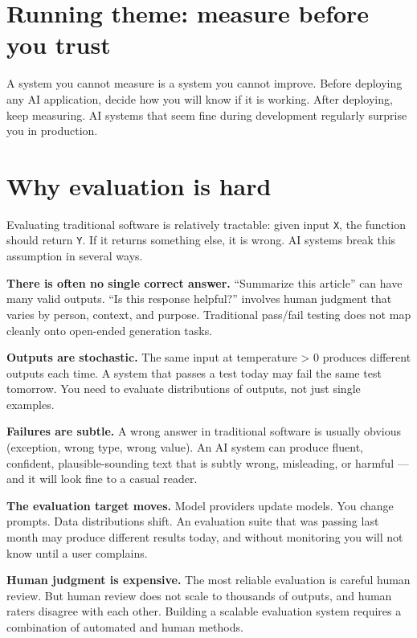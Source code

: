 \section*{Running theme: measure before you trust}

A system you cannot measure is a system you cannot improve. Before deploying any AI application, decide how you will know if it is working. After deploying, keep measuring. AI systems that seem fine during development regularly surprise you in production.

\section{Why evaluation is hard}

Evaluating traditional software is relatively tractable: given input \texttt{X}, the function should return \texttt{Y}. If it returns something else, it is wrong. AI systems break this assumption in several ways.

\textbf{There is often no single correct answer.} ``Summarize this article'' can have many valid outputs. ``Is this response helpful?'' involves human judgment that varies by person, context, and purpose. Traditional pass/fail testing does not map cleanly onto open-ended generation tasks.

\textbf{Outputs are stochastic.} The same input at temperature > 0 produces different outputs each time. A system that passes a test today may fail the same test tomorrow. You need to evaluate distributions of outputs, not just single examples.

\textbf{Failures are subtle.} A wrong answer in traditional software is usually obvious (exception, wrong type, wrong value). An AI system can produce fluent, confident, plausible-sounding text that is subtly wrong, misleading, or harmful --- and it will look fine to a casual reader.

\textbf{The evaluation target moves.} Model providers update models. You change prompts. Data distributions shift. An evaluation suite that was passing last month may produce different results today, and without monitoring you will not know until a user complains.

\textbf{Human judgment is expensive.} The most reliable evaluation is careful human review. But human review does not scale to thousands of outputs, and human raters disagree with each other. Building a scalable evaluation system requires a combination of automated and human methods.


